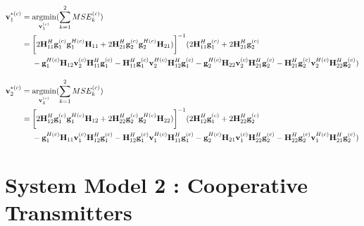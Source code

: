 \documentclass[11pt, oneside]{article}   	%
\begin{document}
\begin{align*}
\textbf{v}^{*(c)}_{1}  &= \operatornamewithlimits{argmin}_{\textbf{v}^{(c)}_{1}}	(\displaystyle\sum_{k=1}^{2}	MSE^{(c)}_{k})	\\
			       &=\bigg[ 2	\textbf{H}^{H}_{11}	\textbf{g}^{(c)}_{1}	\textbf{g}^{H(c)}_{1}		\textbf{H}_{11}
				   +	2	\textbf{H}^{H}_{21}	\textbf{g}^{(c)}_{2}	\textbf{g}^{H(c)}_{2}		\textbf{H}_{21})
				   \bigg]^{-1} 
				   (2	\textbf{H}^{H}_{11}	\textbf{g}^{(c)}_{1}	+	2	\textbf{H}^{H}_{21}	\textbf{g}^{(c)}_{2}	\\
				   &\ \ \ \ -	\textbf{g}^{H(c)}_{1}	\textbf{H}_{12}	\textbf{v}^{(c)}_{2} 	\textbf{H}^{H}_{11}	\textbf{g}^{(c)}_{1}
				   -	\textbf{H}^{H}_{11}	\textbf{g}^{(c)}_{1}	\textbf{v}^{H(c)}_{2}	\textbf{H}^{H}_{12}	\textbf{g}^{(c)}_{1}
				   -	\textbf{g}^{H(c)}_{2}	\textbf{H}_{22}	\textbf{v}^{(c)}_{2} 	\textbf{H}^{H}_{21}	\textbf{g}^{(c)}_{2}
				   -	\textbf{H}^{H}_{21}	\textbf{g}^{(c)}_{2}	\textbf{v}^{H(c)}_{2}	\textbf{H}^{H}_{22}	\textbf{g}^{(c)}_{2}
				   )
\end{align*}

\begin{align*}
\textbf{v}^{*(c)}_{2} 	&= \operatornamewithlimits{argmin}_{\textbf{v}^{(c)}_{2}}	(\displaystyle\sum_{k=1}^{2}	MSE^{(c)}_{k})	\\
				   &= 	\bigg[ 2	\textbf{H}^{H}_{12}	\textbf{g}^{(c)}_{1}	\textbf{g}^{H(c)}_{1}		\textbf{H}_{12}
				   +	2	\textbf{H}^{H}_{22}	\textbf{g}^{(c)}_{2}	\textbf{g}^{H(c)}_{2}		\textbf{H}_{22})
				   \bigg]^{-1} 
				   (2	\textbf{H}^{H}_{12}	\textbf{g}^{(c)}_{1}	+	2	\textbf{H}^{H}_{22}	\textbf{g}^{(c)}_{2}	\\
				   &\ \ \ \ -	\textbf{g}^{H(c)}_{1}	\textbf{H}_{11}	\textbf{v}^{(c)}_{1} 	\textbf{H}^{H}_{12}	\textbf{g}^{(c)}_{1}
				   -	\textbf{H}^{H}_{12}	\textbf{g}^{(c)}_{1}	\textbf{v}^{H(c)}_{1}	\textbf{H}^{H}_{11}	\textbf{g}^{(c)}_{1}
				   -	\textbf{g}^{H(c)}_{2}	\textbf{H}_{21}	\textbf{v}^{(c)}_{1} 	\textbf{H}^{H}_{22}	\textbf{g}^{(c)}_{2}
				   -	\textbf{H}^{H}_{22}	\textbf{g}^{(c)}_{2}	\textbf{v}^{H(c)}_{1}	\textbf{H}^{H}_{21}	\textbf{g}^{(c)}_{2}
				   )
\end{align*}












\newpage

\section{System Model 2 : Cooperative Transmitters }
\end{document}
